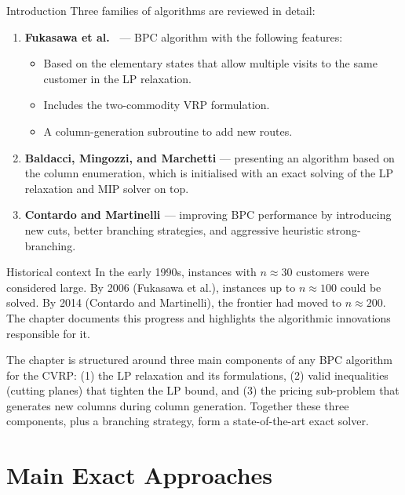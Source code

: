 \documentclass[aspectratio=169,10pt]{beamer}
\begin{document}
\begin{frame}[allowframebreaks]{Introduction}
Three families of algorithms are reviewed in detail:
\begin{enumerate}
  \item \textbf{Fukasawa et al.\ \cite{Fuk06}} --- BPC algorithm with the
        following features:
        \begin{itemize}
          \item Based on the elementary states that allow multiple visits to
                the same customer in the LP relaxation.
          \item Includes the two-commodity VRP formulation.
          \item A column-generation subroutine to add new routes.
        \end{itemize}
  \item \textbf{Baldacci, Mingozzi, and Marchetti} --- presenting an
        algorithm based on the column enumeration, which is initialised
        with an exact solving of the LP relaxation and MIP solver on top.
  \item \textbf{Contardo and Martinelli \cite{Con14}} --- improving BPC
        performance by introducing new cuts, better branching strategies,
        and aggressive heuristic strong-branching.
\end{enumerate}

\framebreak

\begin{alertblock}{Historical context}
In the early 1990s, instances with $n \approx 30$ customers were considered
large. By 2006 (Fukasawa et al.), instances up to $n \approx 100$ could be
solved. By 2014 (Contardo and Martinelli), the frontier had moved to
$n \approx 200$. The chapter documents this progress and highlights the
algorithmic innovations responsible for it.
\end{alertblock}

The chapter is structured around three main components of any BPC algorithm
for the CVRP: (1) the LP relaxation and its formulations,
(2) valid inequalities (cutting planes) that tighten the LP bound, and
(3) the pricing sub-problem that generates new columns during column generation.
Together these three components, plus a branching strategy, form a
state-of-the-art exact solver.

\end{frame}

\section{Main Exact Approaches}
\end{document}
